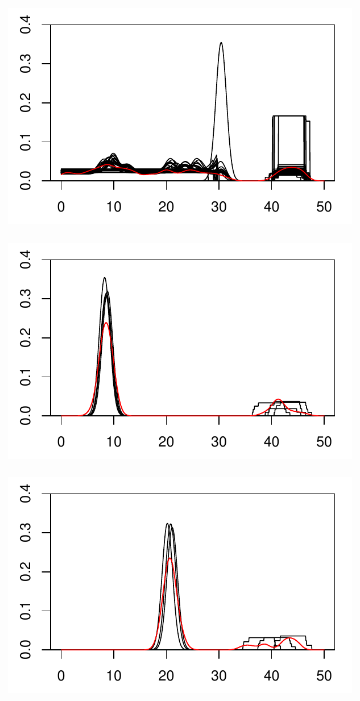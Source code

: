 \begin{figure}[H]
\begin{minipage}{.49\textwidth}
\begin{subfigure}{\linewidth}
\end{subfigure}
\end{minipage}
\begin{minipage}{.49\textwidth}
\begin{subfigure}{\linewidth}
\includegraphics[width=\linewidth]{../simulation/plots/pp_case3_clus1.pdf}
\end{subfigure}
\begin{subfigure}{\linewidth}
\includegraphics[width=\linewidth]{../simulation/plots/pp_case3_clus2.pdf}
\end{subfigure}
\begin{subfigure}{\linewidth}
\includegraphics[width=\linewidth]{../simulation/plots/pp_case3_clus3.pdf}

\end{subfigure}
\end{minipage}
\end{figure}
